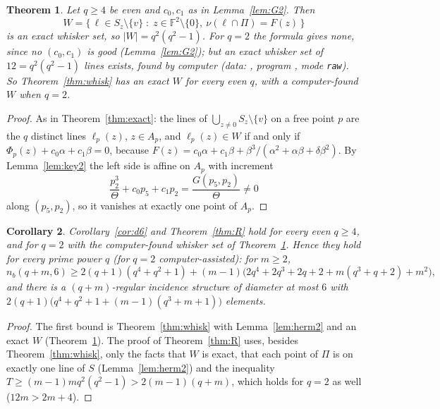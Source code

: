 \documentclass[11pt]{amsart}
\newtheorem{theorem}{Theorem}[section]
\newtheorem{corollary}[theorem]{Corollary}
\theoremstyle{definition}
\theoremstyle{remark}
\newcommand{\F}{\mathbb{F}}
\begin{document}
\begin{theorem}\label{thm:exact2}
Let $q\ge4$ be even and $c_0,c_1$ as in Lemma~\ref{lem:G2}. Then
\[
W=\bigl\{\,\ell\in S_z\setminus\{v\}\;:\;z\in\F^2\setminus\{0\},\ \nu(\ell\cap\Pi)=F(z)\,\bigr\}
\]
is an exact whisker set, so $|W|=q^2(q^2-1)$. For $q=2$ the formula gives none, since no $(c_0,c_1)$ is good (Lemma~\ref{lem:G2}); but an exact whisker set of $12=q^2(q^2-1)$ lines exists, found by computer (data: , program , mode \texttt{raw}). So Theorem~\ref{thm:whisk} has an exact $W$ for every even $q$, with a computer-found $W$ when $q=2$.
\end{theorem}

\begin{proof}
As in Theorem~\ref{thm:exact}: the lines of $\bigcup_{z\ne0}S_z\setminus\{v\}$ on a free point $p$ are the $q$ distinct lines $\ell_p(z)$, $z\in A_p$, and $\ell_p(z)\in W$ if and only if $\Phi_p(z)+c_0\alpha+c_1\beta=0$, because $F(z)=c_0\alpha+c_1\beta+\beta^3/(\alpha^2+\alpha\beta+\delta\beta^2)$. By Lemma~\ref{lem:key2} the left side is affine on $A_p$ with increment
\[
\frac{p_2^3}{\Theta}+c_0p_5+c_1p_2=\frac{G(p_5,p_2)}{\Theta}\ne0
\]
along $(p_5,p_2)$, so it vanishes at exactly one point of $A_p$.
\end{proof}

\begin{corollary}\label{cor:even6}
Corollary~\ref{cor:d6} and Theorem~\ref{thm:R} hold for every even $q\ge4$, and for $q=2$ with the computer-found whisker set of Theorem~\ref{thm:exact2}. Hence they hold for every prime power $q$ \textup{(}for $q=2$ computer-assisted\textup{)}: for $m\ge2$,
\[
n_b(q+m,6)\ge2(q+1)(q^4+q^2+1)+(m-1)\bigl(2q^4+2q^3+2q+2+m(q^3+q+2)+m^2\bigr),
\]
and there is a $(q+m)$-regular incidence structure of diameter at most $6$ with $2(q+1)\bigl(q^4+q^2+1+(m-1)(q^3+m+1)\bigr)$ elements.
\end{corollary}

\begin{proof}
The first bound is Theorem~\ref{thm:whisk} with Lemma~\ref{lem:herm2} and an exact $W$ (Theorem~\ref{thm:exact2}). The proof of Theorem~\ref{thm:R} uses, besides Theorem~\ref{thm:whisk}, only the facts that $W$ is exact, that each point of $\Pi$ is on exactly one line of $S$ (Lemma~\ref{lem:herm2}) and the inequality $T\ge(m-1)mq^2(q^2-1)>2(m-1)(q+m)$, which holds for $q=2$ as well ($12m>2m+4$).
\end{proof}
\end{document}
